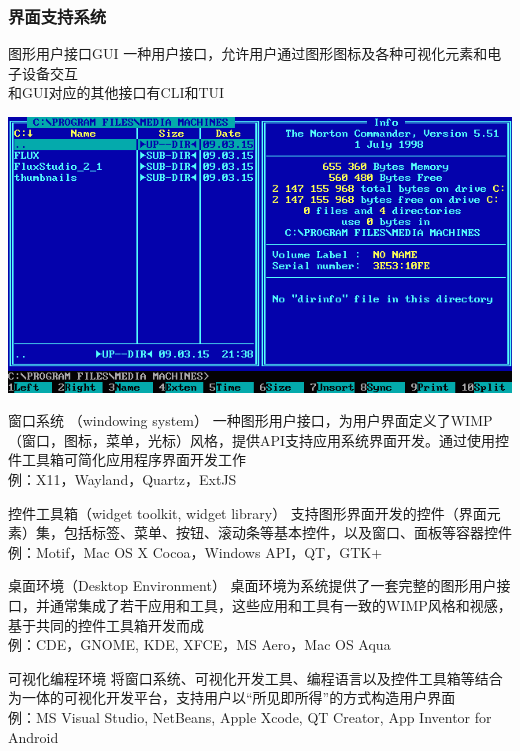 \documentclass[compress]{beamer}
\begin{document}
\begin{frame}
\frametitle{界面支持系统}

 {
\begin{block}{图形用户接口GUI}
一种用户接口，允许用户通过图形图标及各种可视化元素和电子设备交互\\
和GUI对应的其他接口有CLI和TUI
\end{block}

\centering\includegraphics[width=0.7\hsize]{NortonCommander.png}
}

 {
\begin{block} { 窗口系统 （windowing system）}
一种图形用户接口，为用户界面定义了WIMP（窗口，图标，菜单，光标）风格，提供API支持应用系统界面开发。通过使用控件工具箱可简化应用程序界面开发工作\\
例：X11，Wayland，Quartz，ExtJS
\end{block}

\begin{block}{控件工具箱（widget toolkit, widget library）}
支持图形界面开发的控件（界面元素）集，包括标签、菜单、按钮、滚动条等基本控件，以及窗口、面板等容器控件 \\
例：Motif，Mac OS X Cocoa，Windows API，QT，GTK+
\end{block}
}

 {
\begin{block}{桌面环境（Desktop Environment）}
桌面环境为系统提供了一套完整的图形用户接口，并通常集成了若干应用和工具，这些应用和工具有一致的WIMP风格和视感，基于共同的控件工具箱开发而成 \\
例：CDE，GNOME, KDE, XFCE，MS Aero，Mac OS Aqua
\end{block}
}

 {

\begin{block}{可视化编程环境}
将窗口系统、可视化开发工具、编程语言以及控件工具箱等结合为一体的可视化开发平台，支持用户以“所见即所得”的方式构造用户界面 \\
例：MS Visual Studio, NetBeans, Apple Xcode, QT Creator, App Inventor for Android 
\end{block}

}
\end{frame}
\end{document}
